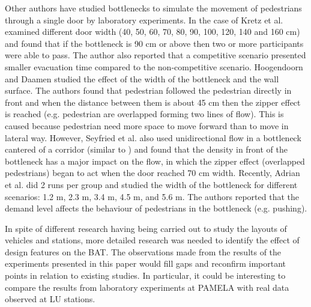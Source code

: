 Other authors have studied bottlenecks to simulate the movement of pedestrians through a single door by laboratory experiments. In the case of Kretz et al. \cite{Ref37} examined different door width (40, 50, 60, 70, 80, 90, 100, 120, 140 and 160 cm) and found that if the bottleneck is 90 cm or above then two or more participants were able to pass. The author also reported that a competitive scenario presented smaller evacuation time compared to the non-competitive scenario. Hoogendoorn and Daamen \cite{Ref38} studied the effect of the width of the bottleneck and the wall surface. The authors found that pedestrian followed the pedestrian directly in front and when the distance between them is about 45 cm then the zipper effect is reached (e.g. pedestrian are overlapped forming two lines of flow). This is caused because pedestrian need more space to move forward than to move in lateral way. However, Seyfried et al. \cite{Ref39} also used unidirectional flow in a bottleneck cantered of a corridor (similar to \cite{Ref37}) and found that the density in front of the bottleneck has a major impact on the flow, in which the zipper effect (overlapped pedestrians) began to act when the door reached 70 cm width. Recently, Adrian et al. \cite{Ref40} did 2 runs per group and studied the width of the bottleneck for different scenarios: 1.2 m, 2.3 m, 3.4 m, 4.5 m, and 5.6 m. The authors reported that the demand level affects the behaviour of pedestrians in the bottleneck (e.g. pushing).

In spite of different research having being carried out to study the layouts of vehicles and stations, more detailed research was needed to identify the effect of design features  on the BAT. The observations made from the results of the experiments presented in this paper would fill gaps and reconfirm important points in relation to existing studies. In particular, it could be interesting to compare the results from laboratory experiments at PAMELA with real data observed at LU stations.
